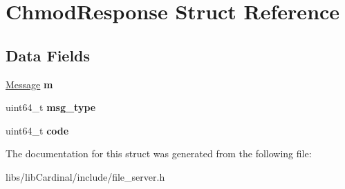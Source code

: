 \hypertarget{structChmodResponse}{}\section{Chmod\+Response Struct Reference}
\label{structChmodResponse}
\subsection*{Data Fields}
\begin{DoxyCompactItemize}
\item 
\hyperlink{structMessage}{Message} {\bfseries m}\hypertarget{structChmodResponse_a945c2162ac20a21aeace637e4403a668}{}\label{structChmodResponse_a945c2162ac20a21aeace637e4403a668}

\item 
uint64\+\_\+t {\bfseries msg\+\_\+type}\hypertarget{structChmodResponse_a143d744b0baadfd65e8e00f3a50809b9}{}\label{structChmodResponse_a143d744b0baadfd65e8e00f3a50809b9}

\item 
uint64\+\_\+t {\bfseries code}\hypertarget{structChmodResponse_a1867374547f0d852f2cd8ae51c4e1c45}{}\label{structChmodResponse_a1867374547f0d852f2cd8ae51c4e1c45}

\end{DoxyCompactItemize}


The documentation for this struct was generated from the following file\+:\begin{DoxyCompactItemize}
\item 
libs/lib\+Cardinal/include/file\+\_\+server.\+h\end{DoxyCompactItemize}
